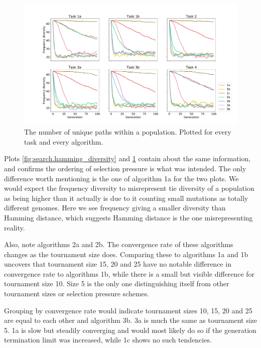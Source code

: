 \begin{figure}
    \includegraphics[width=1.2\textwidth,center]{Chapters/4.Experiments/exp2/figures/inuse/frequency_diversity_unique_path_count.pdf}
    \caption[Unique genome frequency diversity]{The number of unique paths within a population. Plotted for every task and every algorithm.}
    \label{fig:search.frequency_diversity_unique}
\end{figure}

Plots \ref{fig:search.hamming_diversity} and \ref{fig:search.frequency_diversity_unique} contain about the same information, and confirms the ordering of selection pressure is what was intended. The only difference worth mentioning is the one of algorithm 1a for the two plots. We would expect the frequency diversity to misrepresent tie diversity of a population as being higher than it actually is due to it counting small mutations as totally different genomes. Here we see frequency giving a smaller diversity than Hamming distance, which suggests Hamming distance is the one misrepresenting reality. 

Also, note algorithms 2a and 2b. The convergence rate of these algorithms changes as the tournament size does. Comparing these to algorithms 1a and 1b uncovers that tournament size 15, 20 and 25 have no notable difference in convergence rate to algorithms 1b, while there is a small but visible difference for tournament size 10. Size 5 is the only one distinguishing itself from other tournament sizes or selection pressure schemes. 

Grouping by convergence rate would indicate tournament sizes 10, 15, 20 and 25 are equal to each other and algorithm 3b. 3a is much the same as tournament size 5. 1a is slow but steadily converging and would most likely do so if the generation termination limit was increased, while 1c shows no such tendencies. 

